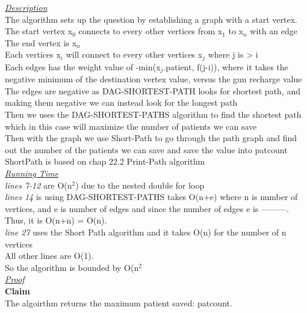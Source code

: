 \documentclass[10pt]{csc_assignment}
\begin{document}
\begin{description}
\emph{\underline{Description}}\\
The algorithm sets up the question by establishing a graph with a start vertex. \\
The start vertex x$_{0}$ connects to every other vertices from x$_{1}$ to x$_{n}$ with an edge\\
The end vertex is x$_{n}$\\
Each vertices x$_{i}$ will connect to every other vertices  x$_{j}$ where j is > i \\ 
Each edges has the weight value of -min(x$_{j}$.patient, f(j-i)), where it takes the negative minimum of the destination vertex value, versus the gun recharge value \\
The edges are negative as DAG-SHORTEST-PATH looks for shortest path, and making them negative we can instead look for the longest path\\
 Then we uses the DAG-SHORTEST-PATHS algorithm to find the shortest path which in this case will maximize the number of patients we can save\\
Then with the graph we use Short-Path to go through the path graph and find out the number of the patients we can save and save the value into patcount\\
ShortPath is based on chap 22.2 Print-Path algorithm\\

\emph{\underline{Running Time}}\\
\emph{lines 7-12 } are O(n$^{2}$) due to the nested double for loop \\
\emph{lines 14} is using DAG-SHORTEST-PATHS takes O(n+e) where n is number of vertices, and e is number of edges and since the number of edges e is ---------. Thus, it is O(n+n) = O(n). \\
\emph{line 27} uses the Short Path algorithm and it takes O(n) for the number of n vertices\\
All other lines are O(1).\\
So the algorithm is bounded by O(n$^{2}$ \\

\emph{\underline{Proof}}\\
\textbf{Claim}\\
The algoirthm returns the maximum patient saved: patcount.\\
  

\end{description}
\end{document}
